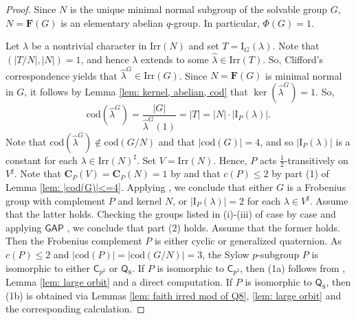 \documentclass[9pt]{article}
\begin{document}
\begin{proof}
  Since $N$ is the unique minimal normal subgroup of the solvable group $G$, $N=\mathbf{F}(G)$ is an elementary abelian $q$-group.
  In particular, $\Phi(G)=1$.
	

  Let $\lambda$ be a nontrivial character in $\mathrm{Irr}(N)$ and set $T=\mathrm{I}_{G}(\lambda)$.
  Note that $(|T/N|,|N|)=1$,
  and hence $\lambda$ extends to some $\hat{\lambda}\in \mathrm{Irr}(T)$.
  So, Clifford's correspondence yields that $\hat{\lambda}^{G}\in \mathrm{Irr}(G)$.
  Since $N=\mathbf{F}(G)$ is minimal normal in $G$,
  it follows by Lemma \ref{lem: kernel, abelian, cod} that $\ker(\hat{\lambda}^{G})=1$.
  So,
  \[
   \mathrm{cod}(\hat{\lambda}^{G})=\frac{|G|}{\hat{\lambda}^{G}(1)}=|T|=|N|\cdot |\mathrm{I}_{P}(\lambda)|.
  \]
  Note that $\mathrm{cod}(\hat{\lambda}^{G})\notin \mathrm{cod}(G/N)$ and that $|\mathrm{cod}(G)|=4$,
  and so $|\mathrm{I}_{P}(\lambda)|$ is a constant for each $\lambda\in \mathrm{Irr}(N)^\sharp$.
  Set $V=\mathrm{Irr}(N)$.
  Hence, $P$ acts $\frac{1}{2}$-transitively on $V^\sharp$.
  Note that $\mathbf{C}_{P}(V)=\mathbf{C}_{P}(N)=1$ by \cite[Lemma 1]{zhang2000} and that $c(P)\leq 2$ by part (1) of Lemma \ref{lem: |cod(G)|<=4}.
  Applying \cite[Theorem II]{isaacspassman1966}, we conclude that either $G$ is a Frobenius group with complement $P$ and kernel $N$, 
  or $|\mathrm{I}_{P}(\lambda)|=2$ for each $\lambda \in V^\sharp$.
  Assume that the latter holds. 
  Checking the groups listed in (i)-(iii) of \cite[Theorem II]{isaacspassman1966} case by case and applying $\mathsf{GAP}$ \cite{gap},
  we conclude that part (2) holds.
  Assume that the former holds.
  Then the Frobenius complement $P$ is either cyclic or generalized quaternion.
  As $c(P)\leq 2$ and $|\mathrm{cod}(P)|=|\mathrm{cod}(G/N)|=3$,
  the Sylow $p$-subgroup $P$ is isomorphic to either $\mathsf{C}_{p^{2}}$ or $\mathsf{Q}_8$.
  If $P$ is isomorphic to $\mathsf{C}_{p^{2}}$,
  then (1a) follows from \cite[Chapter B, Theorem 9.8]{doerk1992}, Lemma \ref{lem: large orbit} and a direct computation. 
  If $P$ is isomorphic to $\mathsf{Q}_8$,
  then (1b) is obtained via Lemmas \ref{lem: faith irred mod of Q8}, \ref{lem: large orbit} and the corresponding calculation.
\end{proof}
\end{document}

